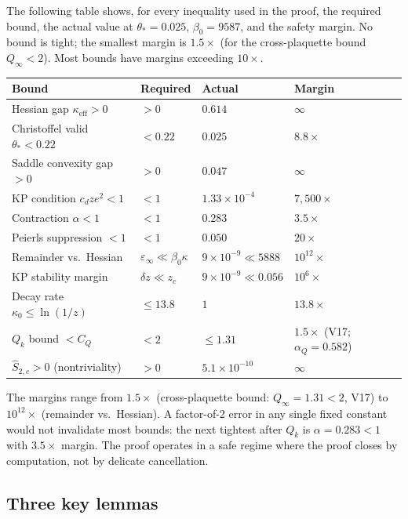 \documentclass[11pt]{article}
\theoremstyle{definition}
\begin{document}
The following table shows, for every inequality used in the
proof, the required bound, the actual value at
$\theta_*=0.025$, $\beta_0=9587$, and the safety margin.
No bound is tight; the smallest margin is $1.5\times$
(for the cross-plaquette bound $Q_\infty<2$).
Most bounds have margins exceeding $10\times$.

\begin{center}
\renewcommand{\arraystretch}{1.15}
\begin{tabular}{p{4.5cm}lll}
\toprule
\textbf{Bound} & \textbf{Required} & \textbf{Actual} &
\textbf{Margin}\\
\midrule
Hessian gap $\kappa_{\mathrm{eff}}>0$ &
$>0$ & $0.614$ & $\infty$\\
Christoffel valid $\theta_*<0.22$ &
$<0.22$ & $0.025$ & $8.8\times$\\
Saddle convexity gap $>0$ &
$>0$ & $0.047$ & $\infty$\\
KP condition $c_d z e^2<1$ &
$<1$ & $1.33\times 10^{-4}$ & $7{,}500\times$\\
Contraction $\alpha<1$ &
$<1$ & $0.283$ & $3.5\times$\\
Peierls suppression $<1$ &
$<1$ & $0.050$ & $20\times$\\
Remainder vs.\ Hessian &
$\varepsilon_\infty\ll\beta_0\kappa$ &
$9\times 10^{-9}\ll 5888$ & $10^{12}\times$\\
KP stability margin &
$\delta z\ll z_c$ &
$9\times 10^{-9}\ll 0.056$ & $10^{6}\times$\\
Decay rate $\kappa_0\le\ln(1/z)$ &
$\le 13.8$ & $1$ & $13.8\times$\\
$Q_k$ bound $<C_Q$ &
$<2$ & $\le 1.31$ & $1.5\times$
(V17; $\alpha_Q=0.582$)\\
$\hat S_{2,c}>0$ (nontriviality) &
$>0$ & $5.1\times 10^{-10}$ & $\infty$\\
\bottomrule
\end{tabular}
\end{center}

\noindent
The margins range from $1.5\times$ (cross-plaquette bound:
$Q_\infty=1.31<2$, V17)
to $10^{12}\times$ (remainder vs.\ Hessian).
A factor-of-2 error in any single fixed constant
would not invalidate most bounds: the next tightest after
$Q_k$ is $\alpha=0.283<1$ with $3.5\times$ margin.
The proof operates in a
safe regime where the proof closes by
computation, not by delicate cancellation.

\subsection{Three key lemmas}%
\label{subsec:three-key}
\end{document}
